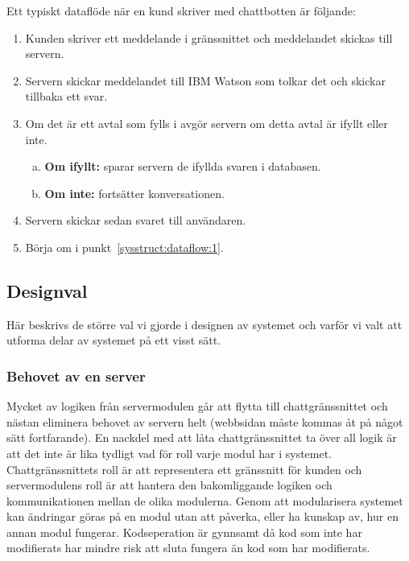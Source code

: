 \documentclass[a4paper,12pt]{article}
\begin{document}
Ett typiskt dataflöde när en kund skriver med chattbotten är följande:
\begin{enumerate}
    \item\label{sysstruct:dataflow:1} Kunden skriver ett meddelande i gränssnittet och meddelandet skickas till servern.
    \item Servern skickar meddelandet till IBM Watson som tolkar det och skickar tillbaka ett svar.
    \item Om det är ett avtal som fylls i avgör servern om detta avtal är ifyllt eller inte.
      \begin{enumerate}[a)]
            \item \textbf{Om ifyllt:} sparar servern de ifyllda svaren i databasen.
            \item \textbf{Om inte:} fortsätter konversationen.
        \end{enumerate}
    \item Servern skickar sedan svaret till användaren.
    \item Börja om i punkt~\ref{sysstruct:dataflow:1}.
\end{enumerate}

\subsection{Designval}

Här beskrivs de större val vi gjorde i designen av systemet och varför vi valt att utforma delar av systemet på ett visst sätt.

\subsubsection{Behovet av en server} 

Mycket av logiken från servermodulen går att flytta till chattgränssnittet och nästan eliminera behovet av servern helt (webbsidan måste kommas åt på något sätt fortfarande). En nackdel med att låta chattgränssnittet ta över all logik är att det inte är lika tydligt vad för roll varje modul har i systemet. Chattgränssnittets roll är att representera ett gränssnitt för kunden och servermodulens roll är att hantera den bakomliggande logiken och kommunikationen mellan de olika modulerna. Genom att modularisera systemet kan ändringar göras på en modul utan att påverka, eller ha kunskap av, hur en annan modul fungerar. Kodseperation är gynnsamt då kod som inte har modifierats har mindre risk att sluta fungera än kod som har modifierats. 
\end{document}

